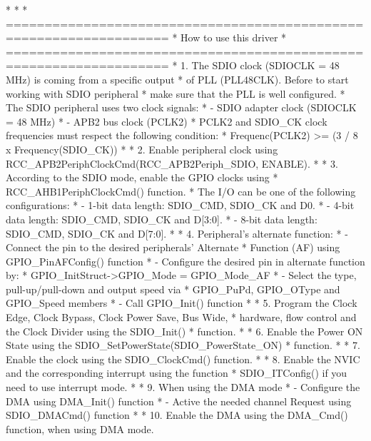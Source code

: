 \begin{DoxyVerb}*
*
*          ===================================================================
*                                 How to use this driver
*          ===================================================================
*          1. The SDIO clock (SDIOCLK = 48 MHz) is coming from a specific output
*             of PLL (PLL48CLK). Before to start working with SDIO peripheral
*             make sure that the PLL is well configured.
*          The SDIO peripheral uses two clock signals:
*              - SDIO adapter clock (SDIOCLK = 48 MHz)
*              - APB2 bus clock (PCLK2)
*          PCLK2 and SDIO_CK clock frequencies must respect the following condition:
*                   Frequenc(PCLK2) >= (3 / 8 x Frequency(SDIO_CK))
*
*          2. Enable peripheral clock using RCC_APB2PeriphClockCmd(RCC_APB2Periph_SDIO, ENABLE).
*
*          3.  According to the SDIO mode, enable the GPIO clocks using 
*              RCC_AHB1PeriphClockCmd() function. 
*              The I/O can be one of the following configurations:
*                 - 1-bit data length: SDIO_CMD, SDIO_CK and D0.
*                 - 4-bit data length: SDIO_CMD, SDIO_CK and D[3:0].
*                 - 8-bit data length: SDIO_CMD, SDIO_CK and D[7:0].      
*
*          4. Peripheral's alternate function: 
*                 - Connect the pin to the desired peripherals' Alternate 
*                   Function (AF) using GPIO_PinAFConfig() function
*                 - Configure the desired pin in alternate function by:
*                   GPIO_InitStruct->GPIO_Mode = GPIO_Mode_AF
*                 - Select the type, pull-up/pull-down and output speed via 
*                   GPIO_PuPd, GPIO_OType and GPIO_Speed members
*                 - Call GPIO_Init() function
*
*          5. Program the Clock Edge, Clock Bypass, Clock Power Save, Bus Wide, 
*             hardware, flow control and the Clock Divider using the SDIO_Init()
*             function.
*
*          6. Enable the Power ON State using the SDIO_SetPowerState(SDIO_PowerState_ON) 
*             function.
*              
*          7. Enable the clock using the SDIO_ClockCmd() function.
*
*          8. Enable the NVIC and the corresponding interrupt using the function 
*             SDIO_ITConfig() if you need to use interrupt mode. 
*
*          9. When using the DMA mode 
*                   - Configure the DMA using DMA_Init() function
*                   - Active the needed channel Request using SDIO_DMACmd() function
*
*          10. Enable the DMA using the DMA_Cmd() function, when using DMA mode. 

\end{DoxyVerb}
